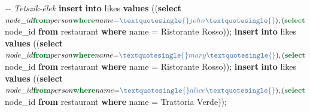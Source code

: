 \documentclass[
  magyar,
]{article}
\newenvironment{Shaded}{}{}
\newcommand{\CommentTok}[1]{\textcolor[rgb]{0.38,0.63,0.69}{\textit{#1}}}
\newcommand{\KeywordTok}[1]{\textcolor[rgb]{0.00,0.44,0.13}{\textbf{#1}}}
\newcommand{\NormalTok}[1]{#1}
\newcommand{\OperatorTok}[1]{\textcolor[rgb]{0.40,0.40,0.40}{#1}}
\newcommand{\StringTok}[1]{\textcolor[rgb]{0.25,0.44,0.63}{#1}}
\begin{document}
\begin{Shaded}
\begin{Highlighting}[]
\CommentTok{{-}{-} Tetszik{-}élek}
\KeywordTok{insert} \KeywordTok{into}\NormalTok{ likes }\KeywordTok{values}
\NormalTok{ ((}\KeywordTok{select}\NormalTok{ $node\_id }\KeywordTok{from}\NormalTok{ person }\KeywordTok{where}\NormalTok{ name }\OperatorTok{=} \StringTok{\textquotesingle{}john\textquotesingle{}}\NormalTok{),}
\NormalTok{ (}\KeywordTok{select}\NormalTok{ $node\_id }\KeywordTok{from}\NormalTok{ restaurant }\KeywordTok{where}\NormalTok{ name }\OperatorTok{=} \StringTok{\textquotesingle{}Ristorante Rosso\textquotesingle{}}\NormalTok{));}
\KeywordTok{insert} \KeywordTok{into}\NormalTok{ likes }\KeywordTok{values}
\NormalTok{ ((}\KeywordTok{select}\NormalTok{ $node\_id }\KeywordTok{from}\NormalTok{ person }\KeywordTok{where}\NormalTok{ name }\OperatorTok{=} \StringTok{\textquotesingle{}mary\textquotesingle{}}\NormalTok{),}
\NormalTok{ (}\KeywordTok{select}\NormalTok{ $node\_id }\KeywordTok{from}\NormalTok{ restaurant }\KeywordTok{where}\NormalTok{ name }\OperatorTok{=} \StringTok{\textquotesingle{}Ristorante Rosso\textquotesingle{}}\NormalTok{));}
\KeywordTok{insert} \KeywordTok{into}\NormalTok{ likes }\KeywordTok{values}
\NormalTok{ ((}\KeywordTok{select}\NormalTok{ $node\_id }\KeywordTok{from}\NormalTok{ person }\KeywordTok{where}\NormalTok{ name }\OperatorTok{=} \StringTok{\textquotesingle{}alice\textquotesingle{}}\NormalTok{),}
\NormalTok{ (}\KeywordTok{select}\NormalTok{ $node\_id }\KeywordTok{from}\NormalTok{ restaurant }\KeywordTok{where}\NormalTok{ name }\OperatorTok{=} \StringTok{\textquotesingle{}Trattoria Verde\textquotesingle{}}\NormalTok{));}


\end{Highlighting}
\end{Shaded}
\end{document}

